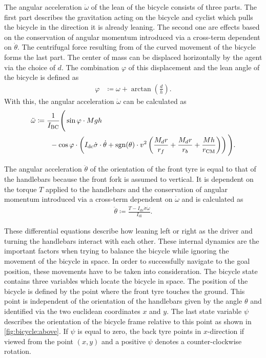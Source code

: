 The angular acceleration $\ddot{\omega}$ of the lean of the bicycle consists of three parts.
The first part describes the gravitation acting on the bicycle and cyclist which pulls the bicycle in the direction it is already leaning.
The second one are effects based on the conservation of angular momentum introduced via a cross-term dependent on  $\dot{\theta}$.
The centrifugal force resulting from of the curved movement of the bicycle forms the last part.
The center of mass can be displaced horizontally by the agent via the choice of $d$.
The combination $\varphi$ of this displacement and the lean angle of the bicycle is defined as
\begin{align}
    \varphi &\coloneqq \omega + \arctan \left( \frac{d}{h} \right).
\end{align}
With this, the angular acceleration $\ddot{\omega}$ can be calculated as
\begin{align}
    \begin{split}
        \ddot{\omega} &\coloneqq \frac{1}{I_{\text{BC}}} \Bigg(
            \sin \varphi \cdot Mgh \\
            &\qquad- \cos \varphi \cdot \left(
                I_{\text{dc}}\dot{\sigma}\cdot\dot{\theta} +
                \operatorname{sgn}(\theta) \cdot v^2 \left(
                    \frac{M_dr}{r_f} + \frac{M_d r}{r_b} + \frac{Mh}{r_{\text{CM}}}
                \right)
            \right)
        \Bigg).
    \end{split}
\end{align}

The angular acceleration $\ddot{\theta}$ of the orientation of the front tyre is equal to that of the handlebars because the front fork is assumed to vertical.
It is dependent on the torque $T$ applied to the handlebars and the conservation of angular momentum introduced via a cross-term dependent on $\dot{\omega}$ and is calculated as
\begin{align}
    \ddot{\theta} \coloneqq \frac{T - I_{\text{dv}}\dot{\sigma}\dot{\omega}}{I_{\text{dl}}}.
\end{align}

These differential equations describe how leaning left or right as the driver and turning the handlebars interact with each other.
These internal dynamics are the important factors when trying to balance the bicycle while ignoring the movement of the bicycle in space.
In order to successfully navigate to the goal position, these movements have to be taken into consideration.
The bicycle state contains three variables which locate the bicycle in space.
The position of the bicycle is defined by the point where the front tyre touches the ground.
This point is independent of the orientation of the handlebars given by the angle $\theta$ and identified via the two euclidean coordinates $x$ and $y$.
The last state variable $\psi$ describes the orientation of the bicycle frame relative to this point as shown in \cref{fig:bicycle:above}.
If $\psi$ is equal to zero, the back tyre points in $x$-direction if viewed from the point $(x, y)$ and a positive $\psi$ denotes a counter-clockwise rotation.

